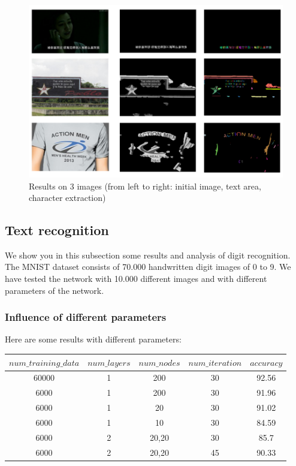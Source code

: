 \documentclass[paper=a4, french, 11pt]{scrartcl}
\begin{document}
\begin{figure}[h]
\begin{center}
   \includegraphics[width=1.0\linewidth]{results.png}
\end{center}
\vspace{-3ex}
\caption{Results on 3 images (from left to right: initial image, text area, character extraction)}
\label{fig:result}
\end{figure}

\subsection{Text recognition} \mbox{} \vspace{-0.5cm}

We show you in this subsection some results and analysis of digit recognition. The MNIST dataset consists of 70.000 handwritten digit images of 0 to 9. We have tested the network with 10.000 different images and with different parameters of the network.

\subsubsection{Influence of different parameters} \mbox{} \vspace{-0.5cm}

Here are some results with different parameters:

\begin{table}[h]
\centering
\begin{small}
	\begin{tabular}{ |c|c|c|c|c| }
	\hline
	$num\_training\_data$ & $num\_layers$ & $num\_nodes$ & $num\_iteration$ & $accuracy$ \\
	\hline
	60000 & 1 & 200  & 30 & 92.56 \\
	\hline
	6000 & 1 & 200  & 30 & 91.96 \\
	\hline
	6000 & 1 & 20  & 30 & 91.02 \\
	\hline
	6000	 & 1 & 10  & 30 & 84.59 \\
	\hline
	6000 & 2 & 20,20  & 30 & 85.7\\
	\hline
	6000 & 2 & 20,20  & 45 & 90.33\\
	\hline
	\end{tabular}
\end{small}
\end{table}
\end{document}
